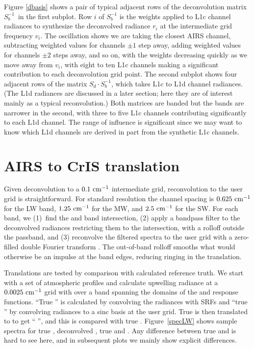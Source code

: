 \documentclass[journal]{IEEEtran}
\begin{document}
Figure \ref{dbasis} shows a pair of typical adjacent rows of the
deconvolution matrix $S_b^{-1}$\, in the first subplot.  Row $i$ of
$S_b^{-1}$ is the weights applied to L1c channel radiances to
synthesize the deconvolved radiance $r_i$ at the intermediate grid
frequency $v_i$.  The oscillation shows we are taking the closest
AIRS channel, subtracting weighted values for channels $\pm 1$ step
away, adding weighted values for channels $\pm 2$ steps away, and so
on, with the weights decreasing quickly as we move away from $v_i$,
with eight to ten L1c channels making a significant contribution to
each deconvolution grid point.  The second subplot shows four
adjacent rows of the matrix $S_d \cdot S_b^{-1}$, which takes L1c to
L1d channel radiances.  (The L1d radiances are discussed in a later
section; here they are of interest mainly as a typical
reconvolution.)  Both matrices are banded but the bands are narrower
in the second, with three to five L1c channels contributing
significantly to each L1d channel.  The range of influence is
significant since we may want to know which L1d channels are derived
in part from the synthetic L1c channels.

\section{AIRS to CrIS translation}
\label{airs2cris}

Given {\airs} deconvolution to a $0.1~\mbox{cm$^{-1}$}$ intermediate grid,
reconvolution to the {\cris} user grid is straightforward.  For
{\cris} standard resolution the channel spacing is $0.625~\mbox{cm$^{-1}$}$ 
for the LW band, $1.25~\mbox{cm$^{-1}$}$ for the MW, and $2.5~\mbox{cm$^{-1}$}$ for the SW.
For each {\cris} band, we (1)~find the {\airs} and {\cris} band
intersection, (2) apply a bandpass filter to the deconvolved {\airs}
radiances restricting them to the intersection, with a rolloff
outside the passband, and (3) reconvolve the filtered spectra to 
the {\cris} user grid with a zero-filled double Fourier transform
\cite{git:finterp}.  The out-of-band rolloff smooths what would
otherwise be an impulse at the band edges, reducing ringing in the
translation.  

Translations are tested by comparison with calculated reference
truth.  We start with a set of atmospheric profiles and calculate
upwelling radiance at a $0.0025~\mbox{cm$^{-1}$}$ grid with {\kcarta}
\cite{kcarta1} over a band spanning the domains of the {\airs} and
{\cris} response functions.  ``True {\airs}'' is calculated by
convolving the {\kcarta} radiances with {\airs} SRFs and ``true
{\cris}'' by convolving {\kcarta} radiances to a sinc basis at the
{\cris} user grid.  True {\airs} is then translated to {\cris} to
get ``{\airs} {\cris}'', and this is compared with true {\cris}.
Figure~\ref{specLW} shows sample spectra for true {\airs},
deconvolved {\airs}, true {\cris} and {\airs} {\cris}.  Any
difference between true {\cris} and {\airs} {\cris} is hard to see
here, and in subsequent plots we mainly show explicit differences.
\end{document}
